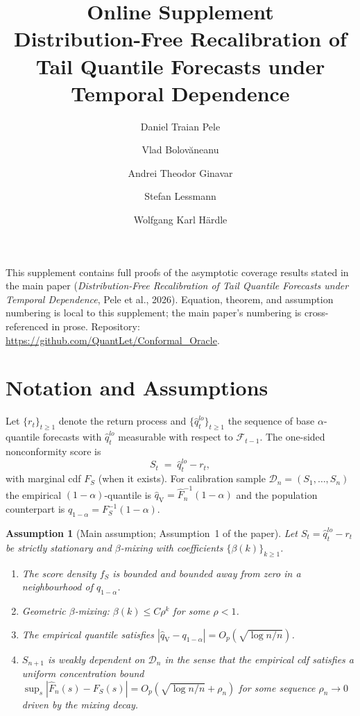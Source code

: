 \documentclass[11pt]{article}
\title{Online Supplement\\
\large Distribution-Free Recalibration of Tail Quantile Forecasts
under Temporal Dependence}
\author{Daniel Traian Pele \and Vlad Bolov\u{a}neanu \and Andrei Theodor
Ginavar \and Stefan Lessmann \and Wolfgang Karl H\"ardle}
\date{}
\newcommand{\qV}{\hat{q}_{\scriptscriptstyle\mathrm{V}}}
\newtheorem{assumption}{Assumption}
\begin{document}
\maketitle

\noindent
This supplement contains full proofs of the asymptotic coverage
results stated in the main paper
(\emph{Distribution-Free Recalibration of Tail Quantile Forecasts
under Temporal Dependence}, Pele et al., 2026). Equation,
theorem, and assumption numbering is local to this supplement; the
main paper's numbering is cross-referenced in prose. Repository:
\url{https://github.com/QuantLet/Conformal_Oracle}.

\section{Notation and Assumptions}

Let $\{r_t\}_{t \geq 1}$ denote the return process and
$\{\hat{q}_t^{lo}\}_{t \geq 1}$ the sequence of base
$\alpha$-quantile forecasts with $\hat{q}_t^{lo}$ measurable with
respect to $\mathcal{F}_{t-1}$. The one-sided nonconformity score
is
\[
S_t \;=\; \hat{q}_t^{lo} - r_t,
\]
with marginal cdf $F_S$ (when it exists). For calibration sample
$\mathcal{D}_n = (S_1,\ldots,S_n)$ the empirical
$(1-\alpha)$-quantile is
$\qV = \hat F_n^{-1}(1-\alpha)$ and the population
counterpart is $q_{1-\alpha} = F_S^{-1}(1-\alpha)$.

\begin{assumption}[Main assumption; Assumption~1 of the paper]
\label{ass:main}
Let $S_t = \hat{q}^{lo}_t - r_t$ be strictly stationary and
$\beta$-mixing with coefficients $\{\beta(k)\}_{k \geq 1}$.
\begin{enumerate}[label=\textup{(A\arabic*)}]
\item\label{ass:density} The score density $f_S$ is bounded and
bounded away from zero in a neighbourhood of $q_{1-\alpha}$.
\item\label{ass:mixing} Geometric $\beta$-mixing:
$\beta(k) \leq C\rho^k$ for some $\rho < 1$.
\item\label{ass:quantile} The empirical quantile satisfies
$|\qV - q_{1-\alpha}| = O_p(\sqrt{\log n / n})$.
\item\label{ass:weak_dep} $S_{n+1}$ is weakly dependent on
$\mathcal{D}_n$ in the sense that the empirical cdf satisfies a
uniform concentration bound
$\sup_s |\hat F_n(s) - F_S(s)|
= O_p(\sqrt{\log n / n} + \rho_n)$
for some sequence $\rho_n \to 0$ driven by the mixing decay.
\end{enumerate}
\end{assumption}
\end{document}
